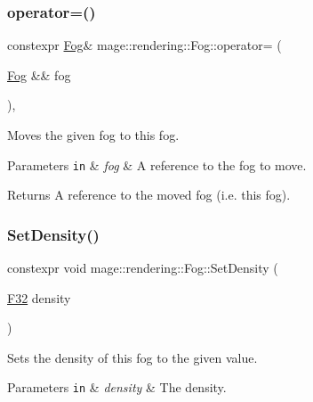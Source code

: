 \subsubsection{\texorpdfstring{operator=()}{operator=()}\hspace{0.1cm}{\footnotesize\ttfamily [2/2]}}
{\footnotesize\ttfamily constexpr \hyperlink{classmage_1_1rendering_1_1_fog}{Fog}\& mage\+::rendering\+::\+Fog\+::operator= (\begin{DoxyParamCaption}\item[{\hyperlink{classmage_1_1rendering_1_1_fog}{Fog} \&\&}]{fog }\end{DoxyParamCaption})\hspace{0.3cm}{\ttfamily [default]}, {\ttfamily [noexcept]}}

Moves the given fog to this fog.


\begin{DoxyParams}[1]{Parameters}
\mbox{\tt in}  & {\em fog} & A reference to the fog to move. \\
\hline
\end{DoxyParams}
\begin{DoxyReturn}{Returns}
A reference to the moved fog (i.\+e. this fog). 
\end{DoxyReturn}
\hypertarget{classmage_1_1rendering_1_1_fog_a9b498c71c58e28bd58b09e4385338a13}{}\label{classmage_1_1rendering_1_1_fog_a9b498c71c58e28bd58b09e4385338a13} 
\subsubsection{\texorpdfstring{Set\+Density()}{SetDensity()}}
{\footnotesize\ttfamily constexpr void mage\+::rendering\+::\+Fog\+::\+Set\+Density (\begin{DoxyParamCaption}\item[{\hyperlink{namespacemage_aa97e833b45f06d60a0a9c4fc22ae02c0}{F32}}]{density }\end{DoxyParamCaption})\hspace{0.3cm}{\ttfamily [noexcept]}}

Sets the density of this fog to the given value.


\begin{DoxyParams}[1]{Parameters}
\mbox{\tt in}  & {\em density} & The density. \\
\hline
\end{DoxyParams}


